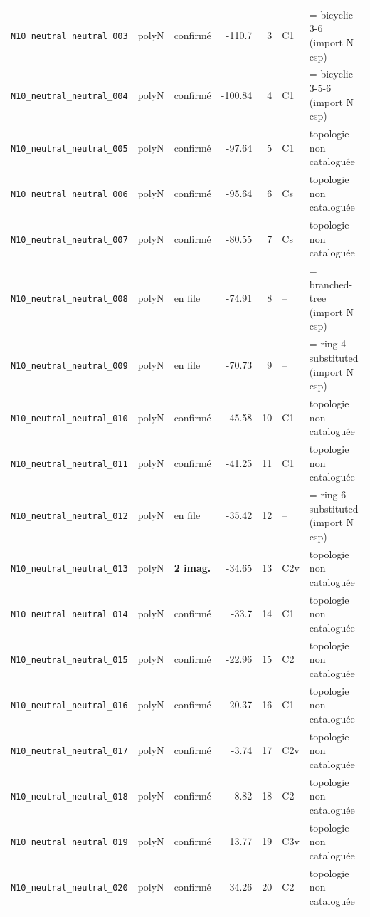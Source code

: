 \begin{longtable}{@{}p{4.2cm}cp{1.3cm}rrp{1.2cm}p{2.6cm}@{}}
\texttt{N10\_neutral\_neutral\_003} & polyN & confirm\'e & -110.7 & 3 & C1 & = bicyclic-3-6 (import N csp) \\
\texttt{N10\_neutral\_neutral\_004} & polyN & confirm\'e & -100.84 & 4 & C1 & = bicyclic-3-5-6 (import N csp) \\
\texttt{N10\_neutral\_neutral\_005} & polyN & confirm\'e & -97.64 & 5 & C1 & topologie non catalogu\'ee \\
\texttt{N10\_neutral\_neutral\_006} & polyN & confirm\'e & -95.64 & 6 & Cs & topologie non catalogu\'ee \\
\texttt{N10\_neutral\_neutral\_007} & polyN & confirm\'e & -80.55 & 7 & Cs & topologie non catalogu\'ee \\
\texttt{N10\_neutral\_neutral\_008} & polyN & en file & -74.91 & 8 & -- & = branched-tree (import N csp) \\
\texttt{N10\_neutral\_neutral\_009} & polyN & en file & -70.73 & 9 & -- & = ring-4-substituted (import N csp) \\
\texttt{N10\_neutral\_neutral\_010} & polyN & confirm\'e & -45.58 & 10 & C1 & topologie non catalogu\'ee \\
\texttt{N10\_neutral\_neutral\_011} & polyN & confirm\'e & -41.25 & 11 & C1 & topologie non catalogu\'ee \\
\texttt{N10\_neutral\_neutral\_012} & polyN & en file & -35.42 & 12 & -- & = ring-6-substituted (import N csp) \\
\texttt{N10\_neutral\_neutral\_013} & polyN & \textbf{2 imag.} & -34.65 & 13 & C2v & topologie non catalogu\'ee \\
\texttt{N10\_neutral\_neutral\_014} & polyN & confirm\'e & -33.7 & 14 & C1 & topologie non catalogu\'ee \\
\texttt{N10\_neutral\_neutral\_015} & polyN & confirm\'e & -22.96 & 15 & C2 & topologie non catalogu\'ee \\
\texttt{N10\_neutral\_neutral\_016} & polyN & confirm\'e & -20.37 & 16 & C1 & topologie non catalogu\'ee \\
\texttt{N10\_neutral\_neutral\_017} & polyN & confirm\'e & -3.74 & 17 & C2v & topologie non catalogu\'ee \\
\texttt{N10\_neutral\_neutral\_018} & polyN & confirm\'e & 8.82 & 18 & C2 & topologie non catalogu\'ee \\
\texttt{N10\_neutral\_neutral\_019} & polyN & confirm\'e & 13.77 & 19 & C3v & topologie non catalogu\'ee \\
\texttt{N10\_neutral\_neutral\_020} & polyN & confirm\'e & 34.26 & 20 & C2 & topologie non catalogu\'ee \\

\end{longtable}
